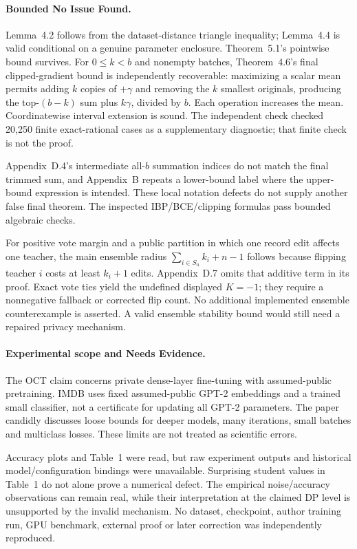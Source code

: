 \documentclass[10pt]{article}
\begin{document}
\paragraph*{Bounded No Issue Found.}\mbox{}\par
Lemma 4.2 follows from the dataset-distance triangle inequality; Lemma 4.4 is valid conditional on a genuine parameter enclosure. Theorem 5.1’s pointwise bound survives. For \(0\le k<b\) and nonempty batches, Theorem 4.6’s final clipped-gradient bound is independently recoverable: maximizing a scalar mean permits adding \(k\) copies of \(+\gamma\) and removing the \(k\) smallest originals, producing the top-\((b-k)\) sum plus \(k\gamma\), divided by \(b\). Each operation increases the mean. Coordinatewise interval extension is sound. The independent check checked 20,250 finite exact-rational cases as a supplementary diagnostic; that finite check is not the proof.\par
Appendix D.4’s intermediate all-\(b\) summation indices do not match the final trimmed sum, and Appendix B repeats a lower-bound label where the upper-bound expression is intended. These local notation defects do not supply another false final theorem. The inspected IBP/BCE/clipping formulas pass bounded algebraic checks.\par
For positive vote margin and a public partition in which one record edit affects one teacher, the main ensemble radius \(\sum_{i\in S_n}k_i+n-1\) follows because flipping teacher \(i\) costs at least \(k_i+1\) edits. Appendix D.7 omits that additive term in its proof. Exact vote ties yield the undefined displayed \(K=-1\); they require a nonnegative fallback or corrected flip count. No additional implemented ensemble counterexample is asserted. A valid ensemble stability bound would still need a repaired privacy mechanism.\par
\paragraph*{Experimental scope and Needs Evidence.}\mbox{}\par
The OCT claim concerns private dense-layer fine-tuning with assumed-public pretraining. IMDB uses fixed assumed-public GPT-2 embeddings and a trained small classifier, not a certificate for updating all GPT-2 parameters. The paper candidly discusses loose bounds for deeper models, many iterations, small batches and multiclass losses. These limits are not treated as scientific errors.\par
Accuracy plots and Table 1 were read, but raw experiment outputs and historical model/configuration bindings were unavailable. Surprising student values in Table 1 do not alone prove a numerical defect. The empirical noise/accuracy observations can remain real, while their interpretation at the claimed DP level is unsupported by the invalid mechanism. No dataset, checkpoint, author training run, GPU benchmark, external proof or later correction was independently reproduced.\par
\end{document}
